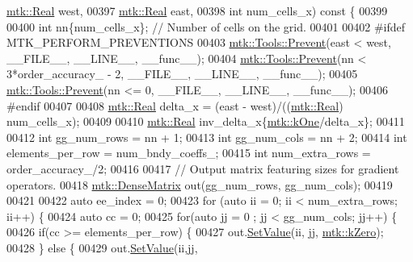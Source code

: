 \begin{DoxyCode}
{{      \hyperlink{group__c01-roots_gac080bbbf5cbb5502c9f00405f894857d}{mtk::Real} west,
00397                                                   \hyperlink{group__c01-roots_gac080bbbf5cbb5502c9f00405f894857d}{mtk::Real} east,
00398                                                   \textcolor{keywordtype}{int} num\_cells\_x)\textcolor{keyword}{ const }\{
00399 
00400   \textcolor{keywordtype}{int} nn\{num\_cells\_x\}; \textcolor{comment}{// Number of cells on the grid.}
00401 
00402 \textcolor{preprocessor}{  #ifdef MTK\_PERFORM\_PREVENTIONS}
00403   \hyperlink{classmtk_1_1Tools_a332324c6f25e66be9dff48c5987a3b9f}{mtk::Tools::Prevent}(east < west, \_\_FILE\_\_, \_\_LINE\_\_, \_\_func\_\_);
00404   \hyperlink{classmtk_1_1Tools_a332324c6f25e66be9dff48c5987a3b9f}{mtk::Tools::Prevent}(nn < 3*order\_accuracy\_ - 2, \_\_FILE\_\_, \_\_LINE\_\_, \_\_func\_\_);
00405   \hyperlink{classmtk_1_1Tools_a332324c6f25e66be9dff48c5987a3b9f}{mtk::Tools::Prevent}(nn <= 0, \_\_FILE\_\_, \_\_LINE\_\_, \_\_func\_\_);
00406 \textcolor{preprocessor}{  #endif}
00407 
00408   \hyperlink{group__c01-roots_gac080bbbf5cbb5502c9f00405f894857d}{mtk::Real} delta\_x = (east - west)/((\hyperlink{group__c01-roots_gac080bbbf5cbb5502c9f00405f894857d}{mtk::Real}) num\_cells\_x);
00409 
00410   \hyperlink{group__c01-roots_gac080bbbf5cbb5502c9f00405f894857d}{mtk::Real} inv\_delta\_x\{\hyperlink{group__c01-roots_ga26407c24d43b6b95480943340d285c71}{mtk::kOne}/delta\_x\};
00411 
00412   \textcolor{keywordtype}{int} gg\_num\_rows = nn + 1;
00413   \textcolor{keywordtype}{int} gg\_num\_cols = nn + 2;
00414   \textcolor{keywordtype}{int} elements\_per\_row = num\_bndy\_coeffs\_;
00415   \textcolor{keywordtype}{int} num\_extra\_rows = order\_accuracy\_/2;
00416 
00417   \textcolor{comment}{// Output matrix featuring sizes for gradient operators.}
00418   \hyperlink{classmtk_1_1DenseMatrix}{mtk::DenseMatrix} out(gg\_num\_rows, gg\_num\_cols);
00419 
00421 
00422   \textcolor{keyword}{auto} ee\_index = 0;
00423   \textcolor{keywordflow}{for} (\textcolor{keyword}{auto} ii = 0; ii < num\_extra\_rows; ii++) \{
00424     \textcolor{keyword}{auto} cc = 0;
00425     \textcolor{keywordflow}{for}(\textcolor{keyword}{auto} jj = 0 ; jj < gg\_num\_cols; jj++) \{
00426       \textcolor{keywordflow}{if}(cc >= elements\_per\_row) \{
00427         out.\hyperlink{classmtk_1_1DenseMatrix_a784ce5784109ac86bfb9d8562b334b13}{SetValue}(ii, jj, \hyperlink{group__c01-roots_ga59a451a5fae30d59649bcda274fea271}{mtk::kZero});
00428       \} \textcolor{keywordflow}{else} \{
00429         out.\hyperlink{classmtk_1_1DenseMatrix_a784ce5784109ac86bfb9d8562b334b13}{SetValue}(ii,jj,
}}
\end{DoxyCode}
